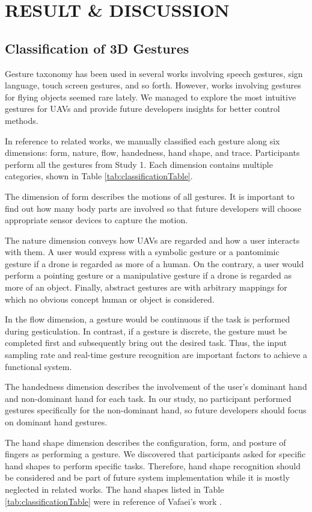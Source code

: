 \documentclass{sigchi}
\begin{document}
\section{RESULT \& DISCUSSION}

\subsection{Classification of 3D Gestures}
Gesture taxonomy has been used in several works involving speech gestures, sign language, touch screen gestures, and so forth. However, works involving gestures for flying objects seemed rare lately. We managed to explore the most intuitive gestures for UAVs and provide future developers insights for better control methods.

In reference to related works, we manually classified each gesture along six dimensions: form, nature, flow, handedness, hand shape, and trace. Participants perform all the gestures from Study 1. Each dimension contains multiple categories, shown in Table \ref{tab:classificationTable}.

The dimension of form describes the motions of all gestures. It is important to find out how many body parts are involved so that future developers will choose appropriate sensor devices to capture the motion.

The nature dimension conveys how UAVs are regarded and how a user interacts with them. A user would express with a symbolic gesture or a pantomimic gesture if a drone is regarded as more of a human. On the contrary, a user would perform a pointing gesture or a manipulative gesture if a drone is regarded as more of an object. Finally, abstract gestures are with arbitrary mappings for which no obvious concept human or object is considered.

In the flow dimension, a gesture would be continuous if the task is performed during gesticulation. In contrast, if a gesture is discrete, the gesture must be completed first and subsequently bring out the desired task. Thus, the input sampling rate and real-time gesture recognition are important factors to achieve a functional system.

The handedness dimension describes the involvement of the user's dominant hand and non-dominant hand for each task. In our study, no participant performed gestures specifically for the non-dominant hand, so future developers should focus on dominant hand gestures.

The hand shape dimension describes the configuration, form, and posture of fingers as performing a gesture. We discovered that participants asked for specific hand shapes to perform specific tasks. Therefore, hand shape recognition should be considered and be part of future system implementation while it is mostly neglected in related works. The hand shapes listed in Table \ref{tab:classificationTable} were in reference of Vafaei's work \cite{Vafaei:2013}.
\end{document}
